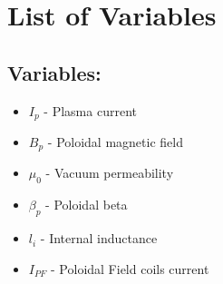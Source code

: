 \chapter*{List of Variables}
\begin{multicols}{2}
\section*{Variables:}
\begin{itemize}
\item $I_p$ - Plasma current
\item $B_p$ - Poloidal magnetic field
\item $\mu_0$ - Vacuum permeability
\item $\beta_p$ - Poloidal beta
\item $l_i$ - Internal inductance
\item $I_{PF}$ - Poloidal Field coils current
\end{itemize}

\end{multicols}